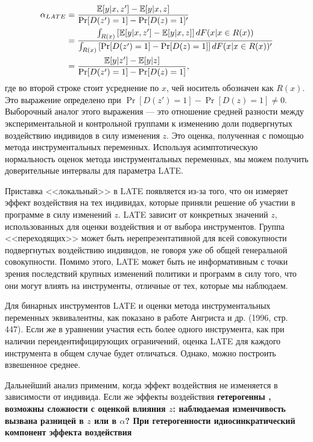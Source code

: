 \begin{align}
\label{eq25.67}
\alpha_{LATE} & = \frac{\mathbb{E} [y | x, z' ] - \mathbb{E} [y | x, z ]}{\mathrm{Pr}[D(z') = 1] -  \mathrm{Pr}[D(z) = 1]'} \\
& = \frac{ \int_{R(x)} \left[ \mathbb{E} [y | x, z' ] - \mathbb{E} [y | x, z ] \right] dF(x|x \in R(x))}{ \int_{R(x)} \left[ \mathrm{Pr}[D(z') = 1] -  \mathrm{Pr}[D(z) = 1] \right] dF(x|x \in R(x))' } \nonumber \\
& = \frac{\mathbb{E} [y | z' ] - \mathbb{E} [y | z ]}{\mathrm{Pr}[D(z') = 1] -  \mathrm{Pr}[D(z) = 1]} , \nonumber
\end{align}
где во второй строке стоит усреднение по $x$, чей носитель обозначен как $R(x)$. Это выражение определено при $\Pr[D(z') = 1] -  \Pr[D(z) = 1] \ne 0$. Выборочный аналог этого выражения --- это отношение средней разности между экспериментальной и контрольной группами к изменению доли подвергнутых воздействию индивидов в силу изменения $z$. Это оценка, полученная с помощью метода инструментальных переменных. Используя асимптотическую нормальность оценок метода инструментальных переменных, мы можем получить доверительные интервалы для параметра LATE. 

Приставка <<локальный>> в LATE появляется из-за того, что он измеряет эффект воздействия на тех индивидах, которые приняли решение об участии в программе в силу изменений $z$. LATE зависит от конкретных значений $z$, использованных для оценки воздействия и от выбора инструментов. Группа <<переходящих>>  может быть нерепрезентативной для всей совокупности подвергнутых воздействию индивидов, не говоря уже об общей генеральной совокупности. Помимо этого, LATE может быть не информативным с точки зрения последствий крупных изменений политики и программ в силу того, что они могут влиять на инструменты, отличные от тех, которые мы наблюдаем. 

Для бинарных инструментов LATE и оценки метода инструментальных переменных эквивалентны, как показано в работе Ангриста и др. (1996, стр. 447). Если же в уравнении участия есть более одного инструмента, как при наличии переидентифицирующих ограничений, оценка LATE для каждого инструмента в общем случае будет отличаться. Однако, можно построить взвешенное среднее. 

Дальнейший анализ применим, когда эффект воздействия не изменяется в зависимости от индивида. Если же эффекты воздействия \bfseries гетерогенны \mdseries, возможны сложности с оценкой влияния $z$: наблюдаемая изменчивость вызвана разницей в $z$ или в $\alpha$? При гетерогенности идиосинкратический компонент эффекта воздействия

